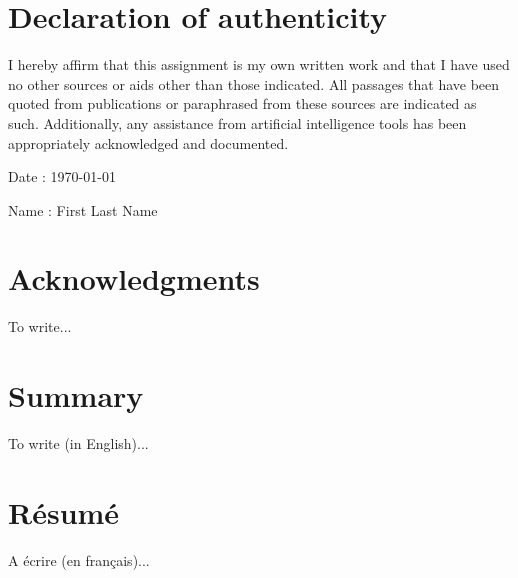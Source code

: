 \documentclass[a4paper,11pt,oneside]{book}
\newcommand{\TMauthorData}{First Last Name}
\newcommand{\DateData}{\today}
\begin{document}
\frontmatter

\pagestyle{empty}
\TMmaketitle

\pagestyle{mainstyle}

\tableofcontents
\clearpage

\chapter{Declaration of authenticity}
I hereby affirm that this assignment is my own written work and that I have used no other sources or aids other than those indicated. All passages that have been quoted from publications or paraphrased from these sources are indicated as such. Additionally, any assistance from artificial intelligence tools has been appropriately acknowledged and documented.
\vspace{1cm}

\begin{flushright}
    \begin{minipage}{7cm}
        Date : {\DateData}
        
        Name : {\TMauthorData}
    \end{minipage}
\end{flushright}


\chapter{Acknowledgments}
To write...


\chapter{Summary}
To write (in English)...


\chapter{Résumé}
A écrire (en français)...


\mainmatter
\fullchaptermarktrue %




\end{document}

